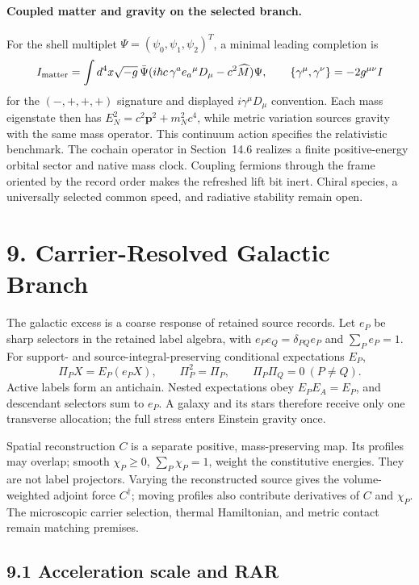 \documentclass[11pt]{article}
\begin{document}
\paragraph{Coupled matter and gravity on the selected branch.}
For the shell multiplet $\Psi=(\psi_0,\psi_1,\psi_2)^T$, a minimal leading completion is
\[
I_{\rm matter}=\int d^4x\sqrt{-g}\,
\bar\Psi(i\hbar c\,\gamma^ae_a{}^\mu D_\mu-c^2\widehat M)\Psi,
\qquad \{\gamma^\mu,\gamma^\nu\}=-2g^{\mu\nu}I
\]
for the $(-,+,+,+)$ signature and displayed $i\gamma^\mu D_\mu$ convention. Each mass eigenstate then has $E_N^2=c^2\mathbf p^2+m_N^2c^4$, while metric variation sources gravity with the same mass operator. This continuum action specifies the relativistic benchmark. The cochain operator in Section~14.6 realizes a finite positive-energy orbital sector and native mass clock. Coupling fermions through the frame oriented by the record order makes the refreshed lift bit inert. Chiral species, a universally selected common speed, and radiative stability remain open.

\section{9. Carrier-Resolved Galactic Branch}

The galactic excess is a coarse response of retained source records. Let $e_P$ be sharp selectors in the retained label algebra, with $e_Pe_Q=\delta_{PQ}e_P$ and $\sum_Pe_P=1$. For support- and source-integral-preserving conditional expectations $E_P$,
\[
\Pi_PX=E_P(e_PX),\qquad \Pi_P^2=\Pi_P,\qquad \Pi_P\Pi_Q=0\ (P\ne Q).
\]
Active labels form an antichain. Nested expectations obey $E_PE_A=E_P$, and descendant selectors sum to $e_P$. A galaxy and its stars therefore receive only one transverse allocation; the full stress enters Einstein gravity once.

Spatial reconstruction $C$ is a separate positive, mass-preserving map. Its profiles may overlap; smooth $\chi_P\ge0$, $\sum_P\chi_P=1$, weight the constitutive energies. They are not label projectors. Varying the reconstructed source gives the volume-weighted adjoint force $C^\dagger$; moving profiles also contribute derivatives of $C$ and $\chi_P$. The microscopic carrier selection, thermal Hamiltonian, and metric contact remain matching premises.

\subsection{9.1 Acceleration scale and RAR}
\end{document}
